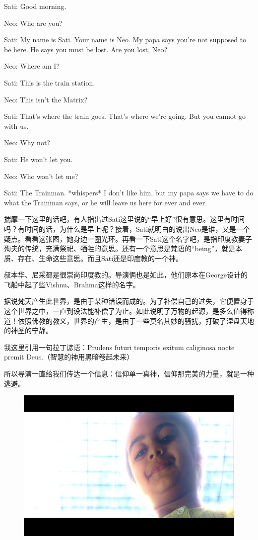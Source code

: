 \documentclass[UTF8]{ctexart}
\newenvironment{myquote}{\color{green} \setlength{\leftskip}{6em} \setlength{\rightskip}{4em} \setlength{\parindent}{-2em}}{\par}
\begin{document}
\begin{myquote}
Sati: Good morning.

Neo: Who are you?

Sati: My name is Sati. Your name is Neo. My papa says you're not supposed to be here. He says you must be lost. Are you lost, Neo?

Neo: Where am I?

Sati: This is the train station.

Neo: This isn't the Matrix?

Sati: That's where the train goes. That's where we're going. But you cannot go with us.

Neo: Why not?

Sati: He won't let you.

Neo: Who won't let me?

Sati: The Trainman. *whispers* I don't like him, but my papa says we have to do what the Trainman says, or he will leave us here for ever and ever.
\end{myquote}

揣摩一下这里的话吧，有人指出过Sati这里说的“早上好”很有意思。这里有时间吗？有时间的话，为什么是早上呢？接着，Sati就明白的说出Neo是谁，又是一个疑点。看看这张图，她身边一圈光环。再看一下Sati这个名字吧，是指印度教妻子殉夫的传统，充满祭祀、牺牲的意思。还有一个意思是梵语的“being”，就是本质、存在、生命这些意思。而且Sati还是印度教的一个神。

叔本华、尼采都是很崇尚印度教的。导演俩也是如此，他们原本在George设计的飞船中起了些Vishnu、Brahma这样的名字。

据说梵天产生此世界，是由于某种错误而成的。为了补偿自己的过失，它便置身于这个世界之中，一直到设法能补偿了为止。如此说明了万物的起源，是多么值得称道！依照佛教的教义，世界的产生，是由于一些莫名其妙的骚扰，打破了涅盘天地的神圣的宁静。

我这里引用一句拉丁谚语：Prudens futuri temporis exitum caliginosa nocte premit Deus.（智慧的神用黑暗卷起未来）

所以导演一直给我们传达一个信息：信仰单一真神，信仰那完美的力量，就是一种逃避。

\begin{figure}[htb]
\centering
\includegraphics[width=0.5\linewidth]{fig/cce0b3b70bb105f431add112.jpg}
\end{figure}
\end{document}
